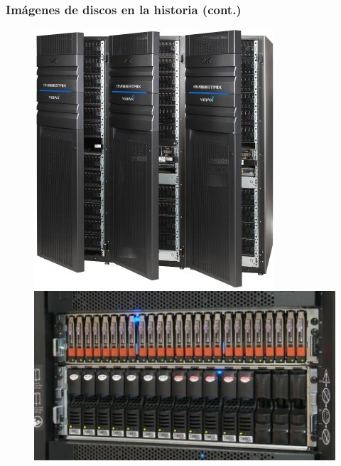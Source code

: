 \begin{frame}
  \frametitle{Imágenes de discos en la historia (cont.)}
  \begin{figure}
    \includegraphics[scale=0.4]{images/oldDisk5.png}
    \includegraphics[scale=0.4]{images/oldDisk6.png}
  \end{figure}
\end{frame}